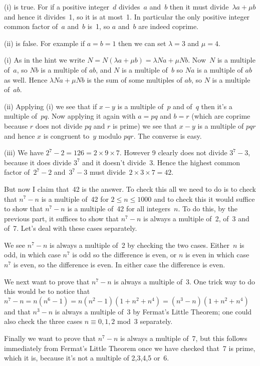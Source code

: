 \documentclass[10pt]{article}
\begin{document}
\medskip{} (i) is true. For if a positive integer~$d$ divides~$a$ and~$b$ then it must divide~$\lambda a+\mu b$ and hence it divides~1, so it is at most~1. In particular the only positive integer common factor of~$a$ and~$b$ is~1, so $a$ and~$b$ are indeed coprime.

(ii) is false. For example if $a=b=1$ then we can set $\lambda=3$ and $\mu=4$.

\medskip{} (i) As in the hint we write $N=N(\lambda a+\mu b)=\lambda Na+\mu Nb$. Now~$N$ is a multiple of~$a$, so $Nb$ is a multiple of $ab$, and $N$ is a multiple of~$b$ so $Na$ is a multiple of $ab$ as well. Hence $\lambda Na+\mu Nb$ is the sum of some multiples of $ab$, so $N$ is a multiple of~$ab$.

(ii) Applying (i) we see that if $x-y$ is a multiple of~$p$ and of~$q$ then it's a multiple of~$pq$. Now applying it again with $a=pq$ and $b=r$ (which are coprime because $r$ does not divide $pq$ and $r$ is prime) we see that $x-y$ is a multiple of $pqr$ and hence $x$ is congruent to~$y$ modulo $pqr$. The converse is easy.

(iii) We have $2^7-2=126=2\times 9\times 7$. However 9 clearly does not divide $3^7-3$, because it does divide $3^7$ and it doesn't divide~3. Hence the highest common factor of~$2^7-2$ and~$3^7-3$ must divide~$2\times 3\times7=42$.

But now I claim that~42 is the answer. To check this all we need to do is to check that $n^7-n$ is a multiple of~42 for $2\leq n\leq 1000$ and to check this it would suffice to show that $n^7-n$ is a multiple of~42 for all integers~$n$. To do this, by the previous part, it suffices to show that $n^7-n$ is always a multiple of~2, of~3 and of~7. Let's deal with these cases separately.

We see $n^7-n$ is always a multiple of~2 by checking the two cases. Either~$n$ is odd, in which case $n^7$ is odd so the difference is even, or $n$ is even in which case $n^7$ is even, so the difference is even. In either case the difference is even.

We next want to prove that $n^7-n$ is always a multiple of~3. One trick way to do this would be to notice that $n^7-n=n(n^6-1)=n(n^2-1)(1+n^2+n^4)=(n^3-n)(1+n^2+n^4)$ and that $n^3-n$ is always a multiple of~3 by Fermat's Little Theorem; one could also check the three cases $n\equiv0,1,2$ mod~3 separately.

Finally we want to prove that $n^7-n$ is always a multiple of~7, but this follows immediately from Fermat's Little Theorem once we have checked that~7 is prime, which it is, because it's not a multiple of 2,3,4,5 or~6. 
\end{document}
